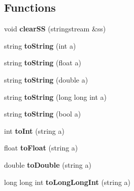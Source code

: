 \subsection*{Functions}
\begin{DoxyCompactItemize}
\item 
\hypertarget{namespacecommon_aa388eb4aec4a6c1fc25e4af17bcd35b6}{void {\bfseries clear\-S\-S} (stringstream \&ss)}\label{namespacecommon_aa388eb4aec4a6c1fc25e4af17bcd35b6}

\item 
\hypertarget{namespacecommon_ab967afcc3037e24ee78ecf6dd92688d5}{string {\bfseries to\-String} (int a)}\label{namespacecommon_ab967afcc3037e24ee78ecf6dd92688d5}

\item 
\hypertarget{namespacecommon_aadec8c454eaea8a3f16e153f9770552d}{string {\bfseries to\-String} (float a)}\label{namespacecommon_aadec8c454eaea8a3f16e153f9770552d}

\item 
\hypertarget{namespacecommon_ae206634061c636d23c21e2b86e6f4f47}{string {\bfseries to\-String} (double a)}\label{namespacecommon_ae206634061c636d23c21e2b86e6f4f47}

\item 
\hypertarget{namespacecommon_aa41a5dacf4897a60f6d4251d57a8404a}{string {\bfseries to\-String} (long long int a)}\label{namespacecommon_aa41a5dacf4897a60f6d4251d57a8404a}

\item 
\hypertarget{namespacecommon_ad4970622daef780374effb8e47cf8134}{string {\bfseries to\-String} (bool a)}\label{namespacecommon_ad4970622daef780374effb8e47cf8134}

\item 
\hypertarget{namespacecommon_a31cd86456425bdd976cc622c5828e17f}{int {\bfseries to\-Int} (string a)}\label{namespacecommon_a31cd86456425bdd976cc622c5828e17f}

\item 
\hypertarget{namespacecommon_affd5ec1cd7889f6e63c8fde2c1db389d}{float {\bfseries to\-Float} (string a)}\label{namespacecommon_affd5ec1cd7889f6e63c8fde2c1db389d}

\item 
\hypertarget{namespacecommon_adeca0735c7b49feb339967ada8cde286}{double {\bfseries to\-Double} (string a)}\label{namespacecommon_adeca0735c7b49feb339967ada8cde286}

\item 
\hypertarget{namespacecommon_a9f91668221fb6afe69e9f8f517a4fe7c}{long long int {\bfseries to\-Long\-Long\-Int} (string a)}\label{namespacecommon_a9f91668221fb6afe69e9f8f517a4fe7c}


\end{DoxyCompactItemize}
